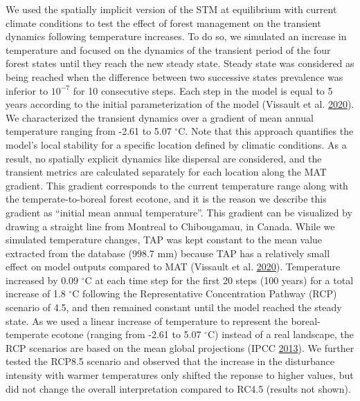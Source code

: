 \documentclass[12pt]{article}
\begin{document}
We used the spatially implicit version of the STM at equilibrium with
current climate conditions to test the effect of forest management on
the transient dynamics following temperature increases. To do so, we
simulated an increase in temperature and focused on the dynamics of the
transient period of the four forest states until they reach the new
steady state. Steady state was considered as being reached when the
difference between two successive states prevalence was inferior to
\(10^{-7}\) for 10 consecutive steps. Each step in the model is equal to
5 years according to the initial parameterization of the model (Vissault
et al. \protect\hyperlink{ref-Vissault2020}{2020}). We characterized the
transient dynamics over a gradient of mean annual temperature ranging
from -2.61 to 5.07 \(^{\circ}\)C. Note that this approach quantifies the
model's local stability for a specific location defined by climatic
conditions. As a result, no spatially explicit dynamics like dispersal
are considered, and the transient metrics are calculated separately for
each location along the MAT gradient. This gradient corresponds to the
current temperature range along with the temperate-to-boreal forest
ecotone, and it is the reason we describe this gradient as ``initial
mean annual temperature''. This gradient can be visualized by drawing a
straight line from Montreal to Chibougamau, in Canada. While we
simulated temperature changes, TAP was kept constant to the mean value
extracted from the database (998.7 mm) because TAP has a relatively
small effect on model outputs compared to MAT (Vissault et al.
\protect\hyperlink{ref-Vissault2020}{2020}). Temperature increased by
0.09 \(^{\circ}\)C at each time step for the first 20 steps (100 years)
for a total increase of 1.8 \(^{\circ}\)C following the Representative
Concentration Pathway (RCP) scenario of 4.5, and then remained constant
until the model reached the steady state. As we used a linear increase
of temperature to represent the boreal-temperate ecotone (ranging from
-2.61 to 5.07 \(^{\circ}\)C) instead of a real landscape, the RCP
scenarios are based on the mean global projections (IPCC
\protect\hyperlink{ref-IPCC2013}{2013}). We further tested the RCP8.5
scenario and observed that the increase in the disturbance intensity
with warmer temperatures only shifted the reponse to higher values, but
did not change the overall interpretation compared to RC4.5 (results not
shown).
\end{document}
